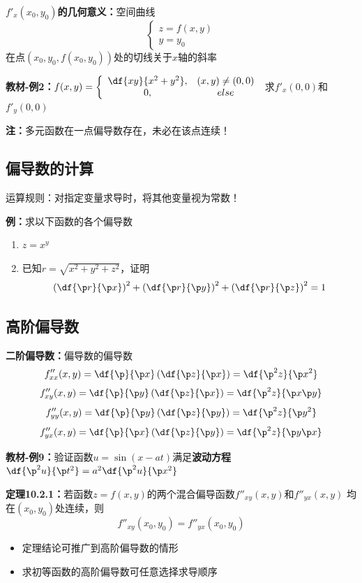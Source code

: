 {\bf $f'_x(x_0,y_0)$的几何意义：}空间曲线
$$\left\{\begin{array}{l}
z=f(x,y)\\ y=y_0
\end{array}\right.$$
在点$(x_0,y_0,f(x_0,y_0))$处的切线关于$x$轴的斜率

{\bf 教材-例2：}$f(x,y)=\left\{\begin{array}{cc}
	\df{xy}{x^2+y^2}, & (x,y)\ne (0,0)\\
	0, & else
\end{array}\right.$
求$f'_x(0,0)$和$f'_y(0,0)$

{\bf 注：}多元函数在一点偏导数存在，未必在该点连续！

\subsection{偏导数的计算}

运算规则：对指定变量求导时，将其他变量视为常数！

{\bf 例：}求以下函数的各个偏导数
\begin{enumerate}[(1)]
  \setlength{\itemindent}{1cm}
  \item $z=x^y$
  \item 已知$r=\sqrt{x^2+y^2+z^2}$，证明
	$$\left(\df{\p r}{\p x}\right)^2+\left(\df{\p r}{\p y}\right)^2+\left(\df{\p
	r}{\p z}\right)^2=1$$
\end{enumerate}

\subsection{高阶偏导数}

{\bf 二阶偏导数：}偏导数的偏导数 
$${f''_{xx}(x,y)=\df{\p}{\p x}\left(\df{\p z}{\p x}\right)
=\df{\p^2 z}{\p x^2}}$$ 
$${f''_{xy}(x,y)=\df{\p}{\p y}\left(\df{\p z}{\p x}\right)
=\df{\p^2 z}{\p x\p y}}$$ 
$${f''_{yy}(x,y)=\df{\p}{\p y}\left(\df{\p z}{\p y}\right)
=\df{\p^2 z}{\p y^2}}$$ 
$${f''_{yx}(x,y)=\df{\p}{\p x}\left(\df{\p z}{\p y}\right)
=\df{\p^2 z}{\p y\p x}}$$

{\bf 教材-例9：}验证函数$u=\sin(x-at)$满足{\bf 波动方程}
$\df{\p^2u}{\p t^2}=a^2\df{\p^2u}{\p x^2}$

{\bf 定理10.2.1：}若函数$z=f(x,y)$的两个混合偏导函数$f''_{xy}(x,y)$和$f''_{yx}(x,y)$
均在$(x_0,y_0)$处连续，则
$$f''_{xy}(x_0,y_0)=f''_{yx}(x_0,y_0)$$

\begin{itemize}
  \item 定理结论可推广到高阶偏导数的情形
  \item 求初等函数的高阶偏导数可任意选择求导顺序
\end{itemize}

